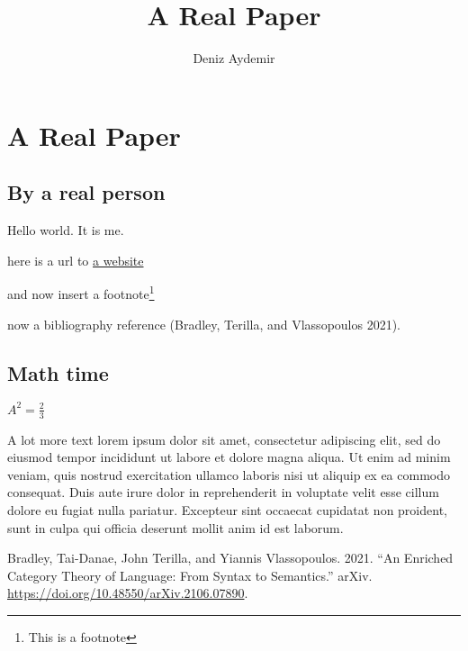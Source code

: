\documentclass[
]{article}
\title{A Real Paper}
\author{Deniz Aydemir}
\date{}
\newlength{\cslhangindent}
\newenvironment{CSLReferences}[2] %
 {\begin{list}{}{%
  \setlength{\itemindent}{0pt}
  \setlength{\leftmargin}{0pt}
  \setlength{\parsep}{0pt}
  \ifodd #1
   \setlength{\leftmargin}{\cslhangindent}
   \setlength{\itemindent}{-1\cslhangindent}
  \fi
  \setlength{\itemsep}{#2\baselineskip}}}
 {\end{list}}
\begin{document}
\maketitle

\section{A Real Paper}\label{a-real-paper}

\subsection{By a real person}\label{by-a-real-person}

Hello world. It is me.

here is a url to \href{https://test.com/}{a website}

and now insert a footnote\footnote{This is a footnote}

now a bibliography reference (Bradley, Terilla, and Vlassopoulos 2021).

\subsection{Math time}\label{math-time}

\(A^2 = \frac{2}{3}\)

A lot more text lorem ipsum dolor sit amet, consectetur adipiscing elit,
sed do eiusmod tempor incididunt ut labore et dolore magna aliqua. Ut
enim ad minim veniam, quis nostrud exercitation ullamco laboris nisi ut
aliquip ex ea commodo consequat. Duis aute irure dolor in reprehenderit
in voluptate velit esse cillum dolore eu fugiat nulla pariatur.
Excepteur sint occaecat cupidatat non proident, sunt in culpa qui
officia deserunt mollit anim id est laborum.

\protect{}\label{refs}
\begin{CSLReferences}{1}{0}
Bradley, Tai-Danae, John Terilla, and Yiannis Vlassopoulos. 2021. {``An
Enriched Category Theory of Language: From Syntax to Semantics.''}
arXiv. \url{https://doi.org/10.48550/arXiv.2106.07890}.

\end{CSLReferences}
\end{document}
